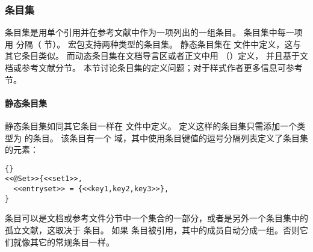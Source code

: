 \subsubsection{条目集}%
\label{use:use:set}


条目集是用单个引用并在参考文献中作为一项列出的一组条目。
条目集中每一项用  分隔（ 节）。
\biblatex 宏包支持两种类型的条目集。
静态条目集在  文件中定义，这与其它条目类似。
而动态条目集在文档导言区或者正文中用  （）定义，
并且基于文档或参考文献分节。
本节讨论条目集的定义问题；对于样式作者更多信息可参考  节。

\paragraph{静态条目集}%


静态条目集如同其它条目一样在  文件中定义。
定义这样的条目集只需添加一个类型为  的条目。
该条目有一个  域，其中使用条目键值的逗号分隔列表定义了条目集的元素：

\begin{lstlisting}[style=bibtex]{}
<<@Set>>{<<set1>>,
  <<entryset>> = {<<key1,key2,key3>>},
}
\end{lstlisting}
%
条目可以是文档或参考文件分节中一个集合的一部分，或者是另外一个条目集中的孤立文献，这取决于  条目。
如果  条目被引用，其中的成员自动分成一组。否则它们就像其它的常规条目一样。

